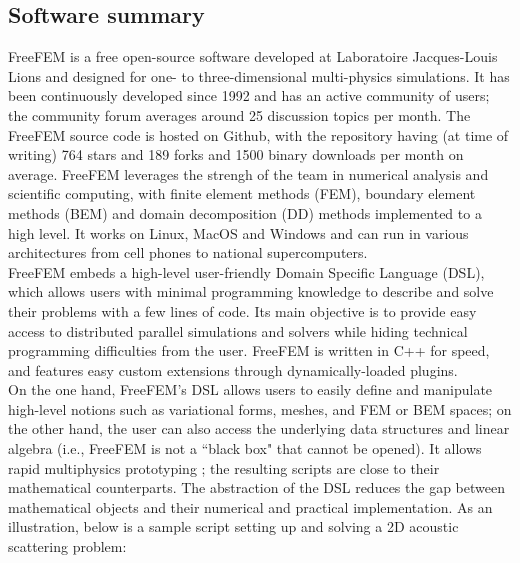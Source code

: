 \subsection{Software summary}
\label{sec:Freefem++:summary}
FreeFEM is a free open-source software developed at Laboratoire Jacques-Louis Lions and designed for one- to three-dimensional multi-physics simulations. It has been continuously developed since 1992 and has an active community of users; the community forum averages around 25 discussion topics per month. The FreeFEM source code is hosted on Github, with the repository having (at time of writing) 764 stars and 189 forks and 1500 binary downloads per month on average. FreeFEM leverages the strengh of the team in numerical analysis and scientific computing, with finite element methods (FEM), boundary element methods (BEM) and domain decomposition (DD) methods implemented to a high level. It works on Linux, MacOS and Windows and can run in various architectures from cell phones to national supercomputers. \\

FreeFEM embeds a high-level user-friendly Domain Specific Language (DSL), which allows users with minimal programming knowledge to describe and solve their problems with a few lines of code. Its main objective is to provide easy access to distributed parallel simulations and solvers while hiding technical programming difficulties from the user. FreeFEM is written in C++ for speed, and features easy custom extensions through dynamically-loaded plugins.\\
On the one hand, FreeFEM’s DSL allows users to easily define and manipulate high-level notions such as variational forms, meshes, and FEM or BEM spaces; on the other hand, the user can also access the underlying data structures and linear algebra (i.e., FreeFEM is not a “black box" that cannot be opened). It allows rapid multiphysics prototyping ; the resulting scripts are  close to their mathematical counterparts. The abstraction of the DSL reduces the gap between mathematical objects and their numerical and practical implementation. As an illustration, below is a sample script setting up and solving a 2D acoustic scattering problem:


